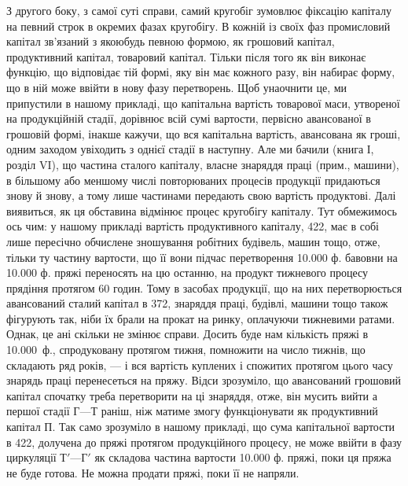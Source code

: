 З другого боку, з самої суті справи, самий кругобіг зумовлює фіксацію
капіталу на певний строк в окремих фазах кругобігу. В кожній із
своїх фаз промисловий капітал зв’язаний з якоюбудь певною формою,
як грошовий капітал, продуктивний капітал, товаровий капітал. Тільки
після того як він виконає функцію, що відповідає тій формі, яку він
має кожного разу, він набирає форму, що в ній може ввійти в нову
фазу перетворень. Щоб унаочнити це, ми припустили в нашому прикладі,
що капітальна вартість товарової маси, утвореної на продукційній стадії,
дорівнює всій сумі вартости, первісно авансованої в грошовій формі,
інакше кажучи, що вся капітальна вартість, авансована як гроші, одним
заходом увіходить з однієї стадії в наступну. Але ми бачили (книга І,
розділ VI), що частина сталого капіталу, власне знаряддя праці (прим.,
машини), в більшому або меншому числі повторюваних процесів продукції
придаються знову й знову, а тому лише частинами передають свою вартість
продуктові. Далі виявиться, як ця обставина відмінює процес кругобігу
капіталу. Тут обмежимось ось чим: у нашому прикладі вартість
продуктивного капіталу, 422, має в собі лише пересічно обчислене
зношування робітних будівель, машин тощо, отже, тільки ту частину
вартости, що її вони підчас перетворення \num{10.000} ф. бавовни на \num{10.000} ф.
пряжі переносять на цю останню, на продукт тижневого процесу прядіння
протягом 60 годин. Тому в засобах продукції, що на них перетворюється
авансований сталий капітал в 372, знаряддя праці, будівлі,
машини тощо також фігурують так, ніби їх брали на прокат на ринку,
оплачуючи тижневими ратами. Однак, це ані скільки не змінює справи.
Досить буде нам кількість пряжі в \num{10.000}~ф., спродуковану протягом
тижня, помножити на число тижнів, що складають ряд років, — і вся
вартість куплених і спожитих протягом цього часу знарядь праці перенесеться
на пряжу. Відси зрозуміло, що авансований грошовий капітал
спочатку треба перетворити на ці знаряддя, отже, він мусить вийти а
першої стадії $Г — Т$ раніш, ніж матиме змогу функціонувати як продуктивний
капітал $П$. Так само зрозуміло в нашому прикладі, що сума
капітальної вартости в 422, долучена до пряжі протягом продукційного
процесу, не може ввійти в фазу циркуляції $Т' — Г'$ як складова
частина вартости \num{10.000} ф. пряжі, поки ця пряжа не буде готова.
Не можна продати пряжі, поки її не напряли.

